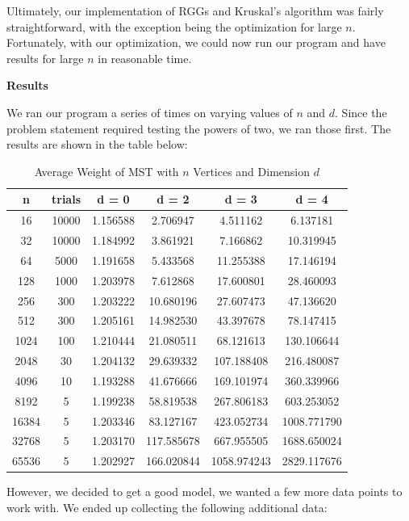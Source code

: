 \documentclass[12pt]{article}
\begin{document}
Ultimately, our implementation of RGGs and Kruskal's algorithm was fairly straightforward, with the exception being the optimization for large $n$. Fortunately, with our optimization, we could now run our program and have results for large $n$ in reasonable time. \\

\bigskip

\pagebreak

\textbf{Results}

We ran our program a series of times on varying values of $n$ and $d$. Since the problem statement required testing the powers of two, we ran those first. The results are shown in the table below: 

\begin{table}[h!]
\centering
\caption{Average Weight of MST with $n$ Vertices and Dimension $d$}
\renewcommand{\arraystretch}{1.1}
{\setlength{\tabcolsep}{15pt}
\begin{tabular} {c | c | c | c | c | c  }
n&trials&d = 0&d = 2&d = 3&d = 4\\ \hline
16&10000&1.156588&2.706947&4.511162&6.137181\\
32&10000&1.184992&3.861921&7.166862&10.319945\\
64&5000&1.191658&5.433568&11.255388&17.146194\\
128&1000&1.203978&7.612868&17.600801&28.460093\\
256&300&1.203222&10.680196&27.607473&47.136620\\
512&300&1.205161&14.982530&43.397678&78.147415\\
1024&100&1.210444&21.080511&68.121613&130.106644\\
2048&30&1.204132&29.639332&107.188408&216.480087\\
4096&10&1.193288&41.676666&169.101974&360.339966\\
8192&5&1.199238&58.819538&267.806183&603.253052\\
16384&5&1.203346&83.127167&423.052734&1008.771790\\
32768&5&1.203170&117.585678&667.955505&1688.650024\\
65536&5&1.202927&166.020844&1058.974243&2829.117676\\
\end{tabular}}
\label{table:1}
\end{table}

However, we decided to get a good model, we wanted a few more data points to work with. We ended up collecting the following additional data:
\end{document}

